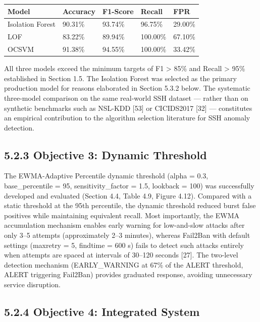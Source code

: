 \documentclass[
  a4paper]{report}
\newcounter{none} %
\begin{document}
{\def\LTcaptype{none} %
\begin{longtable}[]{@{}lllll@{}}
\toprule\noalign{}
Model & Accuracy & F1-Score & Recall & FPR \\
\midrule\noalign{}
\endhead
\bottomrule\noalign{}
\endlastfoot
Isolation Forest & 90.31\% & 93.74\% & 96.75\% & 29.00\% \\
LOF & 83.22\% & 89.94\% & 100.00\% & 67.10\% \\
OCSVM & 91.38\% & 94.55\% & 100.00\% & 33.42\% \\
\end{longtable}
}

All three models exceed the minimum targets of F1 \textgreater{} 85\%
and Recall \textgreater{} 95\% established in Section 1.5. The Isolation
Forest was selected as the primary production model for reasons
elaborated in Section 5.3.2 below. The systematic three-model comparison
on the same real-world SSH dataset --- rather than on synthetic
benchmarks such as NSL-KDD {[}53{]} or CICIDS2017 {[}32{]} ---
constitutes an empirical contribution to the algorithm selection
literature for SSH anomaly detection.

\subsection{5.2.3 Objective 3: Dynamic
Threshold}\label{objective-3-dynamic-threshold}

The EWMA-Adaptive Percentile dynamic threshold (alpha = 0.3,
base\_percentile = 95, sensitivity\_factor = 1.5, lookback = 100) was
successfully developed and evaluated (Section 4.4, Table 4.9, Figure
4.12). Compared with a static threshold at the 95th percentile, the
dynamic threshold reduced burst false positives while maintaining
equivalent recall. Most importantly, the EWMA accumulation mechanism
enables early warning for low-and-slow attacks after only 3--5 attempts
(approximately 2--3 minutes), whereas Fail2Ban with default settings
(maxretry = 5, findtime = 600 s) fails to detect such attacks entirely
when attempts are spaced at intervals of 30--120 seconds {[}27{]}. The
two-level detection mechanism (EARLY\_WARNING at 67\% of the ALERT
threshold, ALERT triggering Fail2Ban) provides graduated response,
avoiding unnecessary service disruption.

\subsection{5.2.4 Objective 4: Integrated
System}\label{objective-4-integrated-system}
\end{document}
